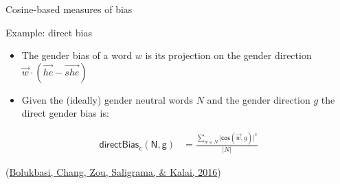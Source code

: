 \documentclass[
  10pt,
  ignorenonframetext,
  x11names, dvipsnames, bibspacing,natbib]{beamer}
\providecommand{\tightlist}{%
  \setlength{\itemsep}{0pt}\setlength{\parskip}{0pt}}
\begin{document}
\begin{frame}{Cosine-based measures of bias}
\protect\hypertarget{cosine-based-measures-of-bias-3}{}
\begin{block}{Example: direct bias}
\protect\hypertarget{example-direct-bias}{}
\begin{itemize}
\tightlist
\item
  The gender bias of a word \(w\) is its projection on the gender
  direction
  \(\vec{w} \cdot (\overrightarrow{he} - \overrightarrow{she})\)
\end{itemize}

\begin{itemize}
\tightlist
\item
  Given the (ideally) gender neutral words \(N\) and the gender
  direction \(g\) the direct gender bias is:
\end{itemize}

\vspace{-2mm}

\begin{align}
\mathsf{directBias_c(N,g)} & = \frac{\sum_{w\in N}\vert \mathsf{cos}(\vec{w},g)\vert^c}{\vert N \vert }
\end{align}

\footnotesize

(\protect\hyperlink{ref-Bolukbasi2016Man}{Bolukbasi, Chang, Zou,
Saligrama, \& Kalai, 2016})
\end{block}
\end{frame}
\end{document}
